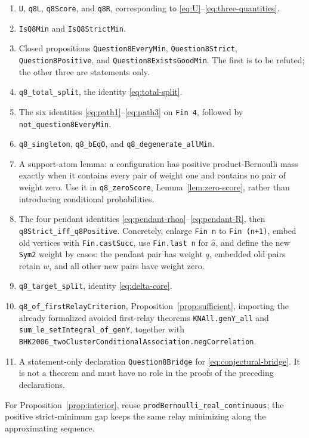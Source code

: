\documentclass[11pt]{article}
\theoremstyle{definition}
\newcommand{\1}{\mathbf 1}
\begin{document}
\begin{enumerate}[label=\texttt{Q8.\arabic*},leftmargin=4em]
\item \texttt{U}, \texttt{q8L}, \texttt{q8Score}, and \texttt{q8R},
corresponding to \eqref{eq:U}--\eqref{eq:three-quantities}.
\item \texttt{IsQ8Min} and \texttt{IsQ8StrictMin}.
\item Closed propositions \texttt{Question8EveryMin},
\texttt{Question8Strict}, \texttt{Question8Positive}, and
\texttt{Question8ExistsGoodMin}.  The first is to be refuted; the other
three are statements only.
\item \texttt{q8\_total\_split}, the identity \eqref{eq:total-split}.
\item The six identities \eqref{eq:path1}--\eqref{eq:path3} on
\texttt{Fin 4}, followed by \texttt{not\_question8EveryMin}.
\item \texttt{q8\_singleton}, \texttt{q8\_bEqO}, and
\texttt{q8\_degenerate\_allMin}.
\item A support-atom lemma: a configuration has positive product-Bernoulli
mass exactly when it contains every pair of weight one and contains no pair
of weight zero.  Use it in \texttt{q8\_zeroScore},
Lemma~\ref{lem:zero-score}, rather than introducing conditional
probabilities.
\item The four pendant identities \eqref{eq:pendant-rhoa}--\eqref{eq:pendant-R},
then \texttt{q8Strict\_iff\_q8Positive}.  Concretely, enlarge
\texttt{Fin n} to \texttt{Fin (n+1)}, embed old vertices with
\texttt{Fin.castSucc}, use \texttt{Fin.last n} for \(\widehat a\), and
define the new \texttt{Sym2} weight by cases: the pendant pair has weight
\(q\), embedded old pairs retain \(w\), and all other new pairs have weight
zero.
\item \texttt{q8\_target\_split}, identity \eqref{eq:delta-core}.
\item \texttt{q8\_of\_firstRelayCriterion},
Proposition~\ref{prop:sufficient}, importing the already formalized avoided
first-relay theorems \texttt{KNAll.genY\_all} and
\texttt{sum\_le\_setIntegral\_of\_genY}, together with
\texttt{BHK2006\_twoClusterConditionalAssociation.negCorrelation}.
\item A statement-only declaration \texttt{Question8Bridge} for
\eqref{eq:conjectural-bridge}.  It is not a theorem and must have no role in
the proofs of the preceding declarations.
\end{enumerate}

For Proposition~\ref{prop:interior}, reuse
\texttt{prodBernoulli\_real\_continuous}; the positive strict-minimum gap
keeps the same relay minimizing along the approximating sequence.
\end{document}
